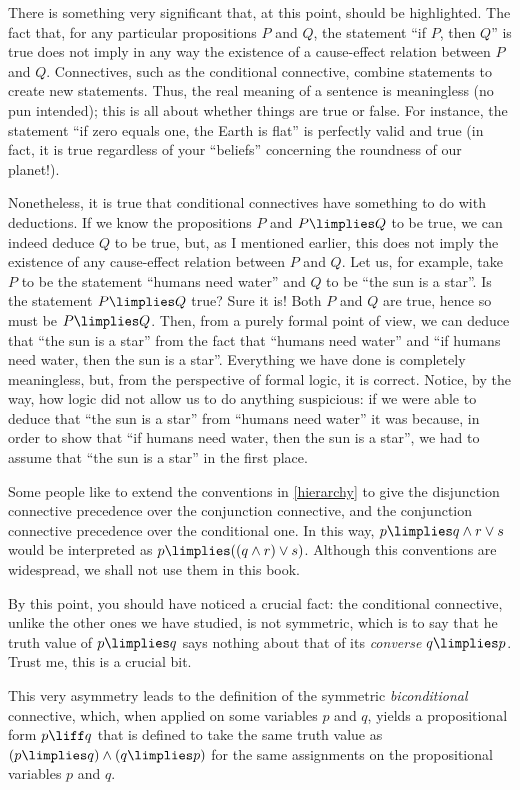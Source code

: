 \begin{remark}
There is something very significant that, at this point, should be highlighted.
The fact that, for any particular propositions $P$ and $Q$, the statement ``if $P$, then $Q$'' is true does not imply in any way the existence of a cause-effect relation between $P$ and $Q$.
Connectives, such as the conditional connective, combine statements to create new statements.
Thus, the real meaning of a sentence is meaningless (no pun intended); this is all about whether things are true or false.
For instance, the statement ``if zero equals one, the Earth is flat'' is perfectly valid and true (in fact, it is true regardless of your ``beliefs'' concerning the roundness of our planet!).

Nonetheless, it is true that conditional connectives have something to do with deductions.
If we know the propositions $P$ and $P\limplies Q$ to be true, we can indeed deduce $Q$ to be true, but, as I mentioned earlier, this does not imply the existence of any cause-effect relation between $P$ and $Q$.
Let us, for example, take $P$ to be the statement ``humans need water'' and $Q$ to be ``the sun is a star''.
Is the statement $P\limplies Q$ true? Sure it is!
Both $P$ and $Q$ are true, hence so must be $P\limplies Q$.
Then, from a purely formal point of view, we can deduce that ``the sun is a star'' from the fact that ``humans need water'' and ``if humans need water, then the sun is a star''.
Everything we have done is completely meaningless, but, from the perspective of formal logic, it is correct.
Notice, by the way, how logic did not allow us to do anything suspicious: if we were able to deduce that ``the sun is a star'' from ``humans need water'' it was because, in order to show that ``if humans need water, then the sun is a star'', we had to assume that ``the sun is a star'' in the first place.

\end{remark}

\begin{para}
Some people like to extend the conventions in \ref{hierarchy} to give the disjunction connective precedence over the conjunction connective, and the conjunction connective precedence over the conditional one.
In this way, $p\limplies q \land r \lor s$ would be interpreted as $p\limplies ((q \land r) \lor s)$.
Although this conventions are widespread, we shall not use them in this book.
\end{para}

\begin{para}
By this point, you should have noticed a crucial fact: the conditional connective, unlike the other ones we have studied, is not symmetric, which is to say that he truth value of $p\limplies q$ says nothing about that of its \emph{converse} $q\limplies p$.
Trust me, this is a crucial bit.

This very asymmetry leads to the definition of the symmetric \emph{biconditional} connective, which, when applied on some variables $p$ and $q$, yields a propositional form $p\liff q$ that is defined to take the same truth value as $(p\limplies q)\land(q\limplies p)$ for the same assignments on the propositional variables $p$ and $q$.
\end{para}


